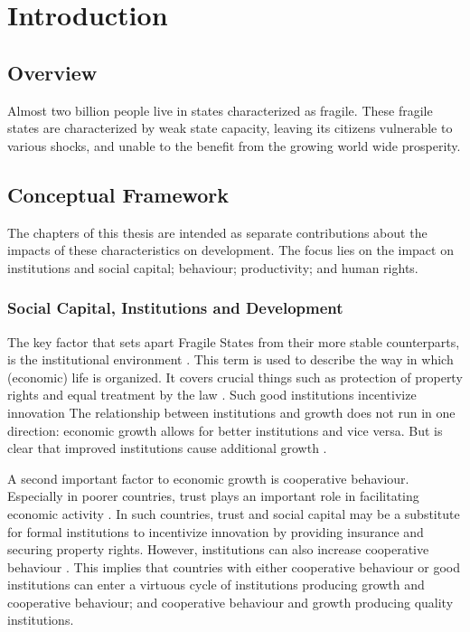\chapter{Introduction}
\section{Overview}



Almost two billion people live in states characterized as fragile. These fragile states are characterized by weak state capacity, leaving its citizens vulnerable to various shocks, and unable to the benefit from the growing world wide prosperity. %




\section{Conceptual Framework}


The chapters of this thesis are intended as separate contributions about the impacts of these characteristics on development. The focus lies on the impact on institutions and social capital; behaviour; productivity; and human rights. 




\subsection{Social Capital, Institutions and Development}
The key factor that sets apart Fragile States from their more stable counterparts, is the institutional environment \cite{Rodrik2004,Acemoglu2000}. This term is used to describe the way in which (economic) life is organized. It covers crucial things such as protection of property rights and equal treatment by the law \citep{Acemoglu2005}. Such good institutions incentivize innovation The relationship between institutions and growth does not run in one direction: economic growth allows for better institutions and vice versa. But is clear that improved institutions cause additional growth \cite{Acemoglu2000}.

A second important factor to economic growth is cooperative behaviour. Especially in poorer countries, trust plays an important role in facilitating economic activity \citep{Knack1997}. In such countries, trust and social capital may be a substitute for formal institutions to incentivize innovation by providing insurance and securing property rights. However, institutions can also increase cooperative behaviour \cite{Bo2008,Henrich2010}. This implies that countries with either cooperative behaviour or good institutions can enter a virtuous cycle of institutions producing growth and cooperative behaviour; and cooperative behaviour and growth producing quality institutions.

